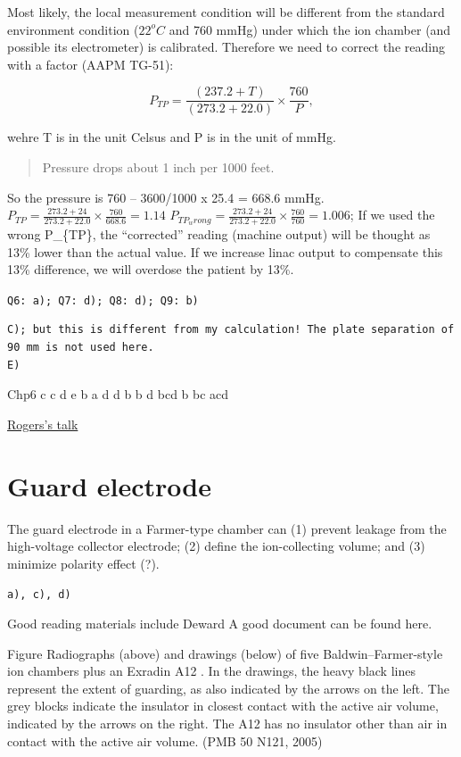 \documentclass[]{book}
\theoremstyle{definition}
\theoremstyle{definition}
\theoremstyle{definition}
\theoremstyle{remark}
\begin{document}
Most likely, the local measurement condition will be different from the
standard environment condition (\(22^{o}C\) and 760 mmHg) under which
the ion chamber (and possible its electrometer) is calibrated. Therefore
we need to correct the reading with a factor (AAPM TG-51):

\begin{equation}
  P_{TP}=\frac{(237.2+T)}{(273.2+22.0)}\times\frac{760}{P},
  \label{eq:ptp}
\end{equation}

wehre T is in the unit Celsus and P is in the unit of mmHg.

\begin{quote}
Pressure drops about 1 inch per 1000 feet.
\end{quote}

So the pressure is 760 -- 3600/1000 x 25.4 = 668.6 mmHg.
\(P_{TP}=\frac{273.2+24}{273.2+22.0} \times \frac{760}{668.6}=1.14\)
\(P_{TP_wrong}=\frac{273.2+24}{273.2+22.0} \times \frac{760}{760}=1.006\);
If we used the wrong P\_\{TP\}, the ``corrected'' reading (machine
output) will be thought as 13\% lower than the actual value. If we
increase linac output to compensate this 13\% difference, we will
overdose the patient by 13\%.

\texttt{Q6:\ a);\ Q7:\ d);\ Q8:\ d);\ Q9:\ b)}

\begin{verbatim}
C); but this is different from my calculation! The plate separation of 90 mm is not used here.
E)
\end{verbatim}

Chp6 c c d e b a d d b b d bcd b bc acd

\href{https://www.aapm.org/meetings/09SS/documents/05Seuntjens-MonteCarloIntro.pdf}{Rogers's
talk}

\section{Guard electrode}\label{guard-electrode}

The guard electrode in a Farmer-type chamber can (1) prevent leakage
from the high-voltage collector electrode; (2) define the ion-collecting
volume; and (3) minimize polarity effect (?).

\texttt{a),\ c),\ d)}

Good reading materials include Deward A good document can be found here.

Figure Radiographs (above) and drawings (below) of five
Baldwin--Farmer-style ion chambers plus an Exradin A12 . In the
drawings, the heavy black lines represent the extent of guarding, as
also indicated by the arrows on the left. The grey blocks indicate the
insulator in closest contact with the active air volume, indicated by
the arrows on the right. The A12 has no insulator other than air in
contact with the active air volume. (PMB 50 N121, 2005)
\end{document}
